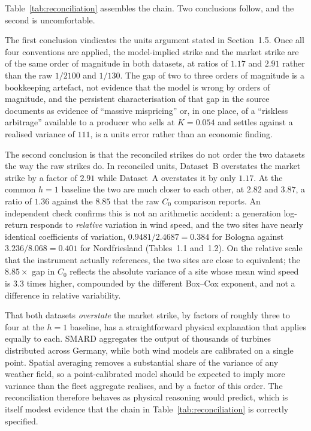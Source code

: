 \documentclass[11pt, a4paper, twoside]{article}
\begin{document}
Table~\ref{tab:reconciliation} assembles the chain. Two conclusions follow, and the second is uncomfortable.

The first conclusion vindicates the units argument stated in Section~1.5. Once all four conventions are applied, the model-implied strike and the market strike are of the same order of magnitude in both datasets, at ratios of $1.17$ and $2.91$ rather than the raw $1/2100$ and $1/130$. The gap of two to three orders of magnitude is a bookkeeping artefact, not evidence that the model is wrong by orders of magnitude, and the persistent characterisation of that gap in the source documents as evidence of ``massive mispricing'' or, in one place, of a ``riskless arbitrage'' available to a producer who sells at $K = 0.054$ and settles against a realised variance of $111$, is a units error rather than an economic finding.

The second conclusion is that the reconciled strikes do not order the two datasets the way the raw strikes do. In reconciled units, Dataset~B overstates the market strike by a factor of $2.91$ while Dataset~A overstates it by only $1.17$. At the common $h = 1$ baseline the two are much closer to each other, at $2.82$ and $3.87$, a ratio of $1.36$ against the $8.85$ that the raw $C_0$ comparison reports. An independent check confirms this is not an arithmetic accident: a generation log-return responds to \emph{relative} variation in wind speed, and the two sites have nearly identical coefficients of variation, $0.9481/2.4687 = 0.384$ for Bologna against $3.236/8.068 = 0.401$ for Nordfriesland (Tables~1.1 and~1.2). On the relative scale that the instrument actually references, the two sites are close to equivalent; the $8.85\times$ gap in $C_0$ reflects the absolute variance of a site whose mean wind speed is $3.3$ times higher, compounded by the different Box--Cox exponent, and not a difference in relative variability.

That both datasets \emph{overstate} the market strike, by factors of roughly three to four at the $h = 1$ baseline, has a straightforward physical explanation that applies equally to each. SMARD aggregates the output of thousands of turbines distributed across Germany, while both wind models are calibrated on a single point. Spatial averaging removes a substantial share of the variance of any weather field, so a point-calibrated model should be expected to imply more variance than the fleet aggregate realises, and by a factor of this order. The reconciliation therefore behaves as physical reasoning would predict, which is itself modest evidence that the chain in Table~\ref{tab:reconciliation} is correctly specified.
\end{document}
